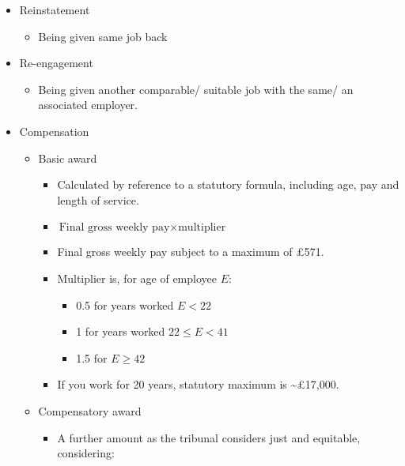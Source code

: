 \documentclass[
]{article}
\providecommand{\tightlist}{%
  \setlength{\itemsep}{0pt}\setlength{\parskip}{0pt}}
\begin{document}
\begin{itemize}
\tightlist
\item
  Reinstatement

  \begin{itemize}
  \tightlist
  \item
    Being given same job back
  \end{itemize}
\item
  Re-engagement

  \begin{itemize}
  \tightlist
  \item
    Being given another comparable/ suitable job with the same/ an
    associated employer.
  \end{itemize}
\item
  Compensation

  \begin{itemize}
  \tightlist
  \item
    Basic award

    \begin{itemize}
    \tightlist
    \item
      Calculated by reference to a statutory formula, including age, pay
      and length of service.
    \item
      {\(\text{Final\ gross\ weekly\ pay} \times \text{multiplier}\)}
    \item
      Final gross weekly pay subject to a maximum of £571.
    \item
      Multiplier is, for age of employee {\(E\)}:

      \begin{itemize}
      \tightlist
      \item
        0.5 for years worked {\(E < 22\)}
      \item
        1 for years worked {\(22 \leq E < 41\)}
      \item
        1.5 for {\(E \geq 42\)}
      \end{itemize}
    \item
      If you work for 20 years, statutory maximum is
      \textasciitilde£17,000.
    \end{itemize}
  \item
    Compensatory award

    \begin{itemize}
    \tightlist
    \item
      A further amount as the tribunal considers just and equitable,
      considering:


\end{itemize}
\end{itemize}
\end{itemize}
\end{document}
